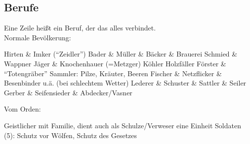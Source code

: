 \subsection{Berufe}
Eine Zeile heißt ein Beruf, der das alles verbindet. \\
Normale Bevölkerung:
\begin{outline}
	 Hirten \& Imker ("`Zeidler"') 
	 Bader \& Müller \& Bäcker \& Brauerei
	 Schmied \& Wappner
	 Jäger \& Knochenhauer (=Metzger)
	 Köhler
	 Holzfäller
	 Förster \& "`Totengräber"'
	 Sammler: Pilze, Kräuter, Beeren
	 Fischer \& Netzflicker \& Besenbinder u.ä. (bei schlechtem Wetter)
	 Lederer \& Schuster \& Sattler \& Seiler
	 Gerber \& Seifensieder \& Abdecker/Vasner
\end{outline}

Vom Orden:
\begin{outline}
	 Geistlicher mit Familie, dient auch als Schulze/Verweser
	\1 eine Einheit Soldaten (5): Schutz vor Wölfen, Schutz des Gesetzes
\end{outline}
